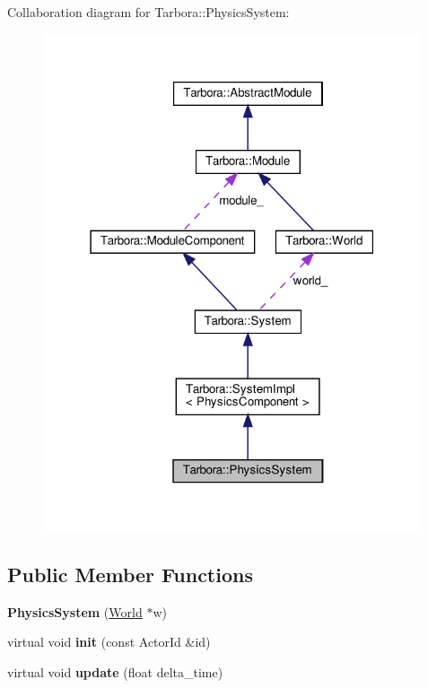 Collaboration diagram for Tarbora\+:\+:Physics\+System\+:\nopagebreak
\begin{figure}[H]
\begin{center}
\leavevmode
\includegraphics[width=316pt]{classTarbora_1_1PhysicsSystem__coll__graph}
\end{center}
\end{figure}
\subsection*{Public Member Functions}
\begin{DoxyCompactItemize}
\item 
\mbox{\label{classTarbora_1_1PhysicsSystem_adcffe4eadcb8ea852099ebb661075ec2}} 
{\bfseries Physics\+System} (\hyperlink{classTarbora_1_1World}{World} $\ast$w)
\item 
\mbox{\label{classTarbora_1_1PhysicsSystem_a1b5ac1c67c926fca91b2d84b5b61c226}} 
virtual void {\bfseries init} (const Actor\+Id \&id)
\item 
\mbox{\label{classTarbora_1_1PhysicsSystem_a218a82658b50a4282fd0cfd38397a9ed}} 
virtual void {\bfseries update} (float delta\+\_\+time)
\end{DoxyCompactItemize}
